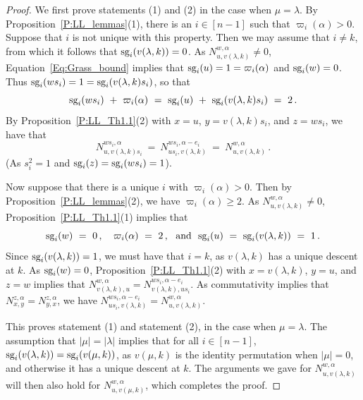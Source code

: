 \documentclass[12pt,oneside,reqno]{amsart}
\theoremstyle{definition}
\numberwithin{equation}{section}
\newcommand{\sg}{{\mbox{\rm sg}}}
\begin{document}
 \begin{proof}
     We first prove statements (1) and (2) in the case when $\mu=\lambda$.
   By Proposition~\ref{P:LL_lemmas}(1), there is an $i\in[n{-}1]$ such that $\varpi_i(\alpha)>0$.
   Suppose that $i$ is not unique with this property.
   Then we may assume that $i\neq k$, from which it follows that $\sg_i(v(\lambda, k)) = 0$.
   As $N^{w,\alpha}_{u,v(\lambda,k)}\neq 0$, Equation~\eqref{Eq:Grass_bound} implies that $\sg_i(u)=1=\varpi_i(\alpha)$ and $\sg_i(w)=0$.
   Thus $\sg_i(ws_i)=1=\sg_i(v(\lambda,k)s_i)$, so that
   \[
     \sg_i(ws_i)\ +\ \varpi_i(\alpha)\ =\ \sg_i(u)\ +\ \sg_i(v(\lambda,k) s_i)\ =\ 2\,.
   \]
   By Proposition~\ref{P:LL_Th1.1}(2) with $x=u$, $y=v(\lambda,k) s_i$, and $z=w s_i$, we have that 
   \[
     N^{ ws_i,\alpha}_{u, v(\lambda,k) s_i}\ =\ N^{ws_i, \alpha-e_i}_{u s_i, v(\lambda,k)}\ =\ N^{w,\alpha}_{u,v(\lambda,k)}\,.
   \]
   (As $s_i^2=1$ and $\sg_i(z)=\sg_i(ws_i)=1$).
   
   Now suppose that there is a unique $i$ with $\varpi_i(\alpha)>0$.
   Then by Proposition~\ref{P:LL_lemmas}(2), we have $\varpi_i(\alpha)\geq 2$.
   As $N^{w,\alpha}_{u,v(\lambda,k)}\neq  0$,  Proposition~\ref{P:LL_Th1.1}(1) implies that 
   \[
     \sg_i(w)\ =\ 0\,,\ \ \ 
     \varpi_i(\alpha)\ =\ 2\,,\ \ \mbox{and}\ \
     \sg_i(u)\ =\ \sg_i(v(\lambda,k))\ = \ 1\,.
   \]
   Since $\sg_i(v(\lambda,k))=1$, we must have that $i=k$, as $v(\lambda,k)$ has a unique descent at $k$.
   As $\sg_i(w)=0$,  Proposition~\ref{P:LL_Th1.1}(2) with $x=v(\lambda,k)$, $y=u$, and $z=w$ implies that
   $N^{w,\alpha}_{v(\lambda,k), u}=N^{w s_i, \alpha-e_i}_{v(\lambda,k), u s_i}$.
   As commutativity implies that $N^{z,\alpha}_{x,y}=N^{z,\alpha}_{y,x}$, we have
   $N^{ws_i, \alpha-e_i}_{u s_i,v(\lambda,k)}=N^{w,\alpha}_{u,v(\lambda,k)}$.

   This proves statement (1) and statement (2), in the case when $\mu=\lambda$.
   The assumption that $|\mu|=|\lambda|$ implies that for all $i\in[n{-}1]$, $\sg_i(v(\lambda,k))=\sg_i(v(\mu,k))$, as
   $v(\mu,k)$ is the identity permutation when $|\mu|=0$, and otherwise it has a unique descent at $k$.
   The arguments we gave for $N^{w,\alpha}_{u,v(\lambda,k)}$ will then also hold for $N^{w,\alpha}_{u,v(\mu,k)}$, which completes the proof.
 \end{proof}
\end{document}
